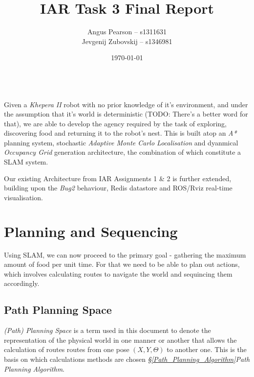 \documentclass[11pt, a4paper]{article}
\renewenvironment{abstract}{%
{\mdseries\scshape\Large\abstractname}
\vspace{1em}\\
}{\par\noindent}
\begin{document}
\title{IAR Task 3 Final Report}
\author{Angus Pearson -- s1311631\\ Jevgenij Zubovskij -- s1346981}
\date{\today}
\maketitle



\begin{abstract}
Given a \textit{Khepera II} robot with no prior knowledge of it's environment, and under the 
assumption that it's world is deterministic (TODO: There's a better word for that), we are able 
to develop the agency required by the task of exploring, discovering food and returning it to the 
robot's nest. This is built atop an \textit{A*} planning system, stochastic \textit{Adaptive Monte Carlo 
Localisation}\cite{principlesrobot} and dyanmical \textit{Occupancy Grid} generation architecture,
the combination of which constitute a SLAM system.

Our existing Architecture from IAR Assignments 1\cite{task1_report} \& 2\cite{task2_report} is further
extended, building upon the \textit{Bug2} behaviour, Redis datastore and ROS/Rviz real-time 
visualisation.

\end{abstract}




\section{Planning and Sequencing}

Using SLAM, we can now proceed to the primary goal - gathering the maximum amount of food per unit time. For that we need to be able to plan out actions, which involves calculating routes to navigate the world and sequincing them accordingly.

\subsection{Path Planning Space}
\label{Path_Planning_Space}

\textit{(Path) Planning Space} is a term used  in this document to denote the representation of the physical world in one manner or another that allows the calculation of routes routes from one pose $(X,Y, \Theta)$ to another one. This is the basis on which calculations methods are chosen \textit{\S\ref{Path_Planning_Algorithm}Path Planning Algorithm}. 
\end{document}
